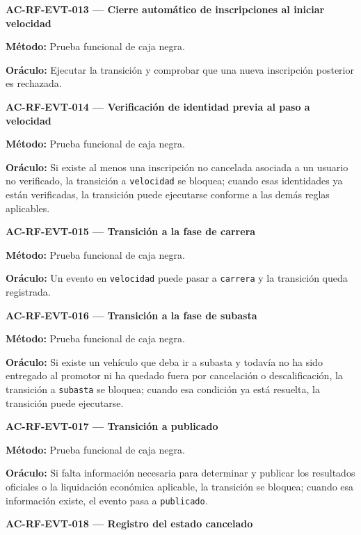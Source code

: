 \documentclass[10pt,letterpaper]{article}
\begin{document}
\noindent\textbf{AC-RF-EVT-013 --- Cierre automático de inscripciones al iniciar velocidad}\par
\textbf{Método:} Prueba funcional de caja negra.\par
\textbf{Oráculo:} Ejecutar la transición y comprobar que una nueva inscripción posterior es rechazada.\par\vspace{0.45em}
\noindent\textbf{AC-RF-EVT-014 --- Verificación de identidad previa al paso a velocidad}\par
\textbf{Método:} Prueba funcional de caja negra.\par
\textbf{Oráculo:} Si existe al menos una inscripción no cancelada asociada a un usuario no verificado, la transición a \texttt{velocidad} se bloquea; cuando esas identidades ya están verificadas, la transición puede ejecutarse conforme a las demás reglas aplicables.\par\vspace{0.45em}
\noindent\textbf{AC-RF-EVT-015 --- Transición a la fase de carrera}\par
\textbf{Método:} Prueba funcional de caja negra.\par
\textbf{Oráculo:} Un evento en \texttt{velocidad} puede pasar a \texttt{carrera} y la transición queda registrada.\par\vspace{0.45em}
\noindent\textbf{AC-RF-EVT-016 --- Transición a la fase de subasta}\par
\textbf{Método:} Prueba funcional de caja negra.\par
\textbf{Oráculo:} Si existe un vehículo que deba ir a subasta y todavía no ha sido entregado al promotor ni ha quedado fuera por cancelación o descalificación, la transición a \texttt{subasta} se bloquea; cuando esa condición ya está resuelta, la transición puede ejecutarse.\par\vspace{0.45em}
\noindent\textbf{AC-RF-EVT-017 --- Transición a publicado}\par
\textbf{Método:} Prueba funcional de caja negra.\par
\textbf{Oráculo:} Si falta información necesaria para determinar y publicar los resultados oficiales o la liquidación económica aplicable, la transición se bloquea; cuando esa información existe, el evento pasa a \texttt{publicado}.\par\vspace{0.45em}
\noindent\textbf{AC-RF-EVT-018 --- Registro del estado cancelado}\par
\end{document}
